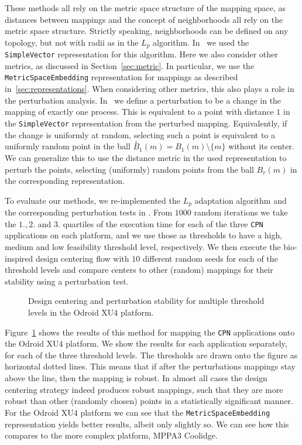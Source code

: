 These methods all rely on the metric space structure of the mapping space, as distances between mappings and the concept of neighborhoods all rely on the metric space structure.
Strictly speaking, neighborhoods can be defined on any topology, but not with radii as in the $L_p$ algorithm.
In~\cite{hempel_scopes17} we used the \texttt{SimpleVector} representation for this algorithm.
Here we also consider other metrics, as discussed in Section~\ref{sec:metric}.
In particular, we use the \texttt{MetricSpaceEmbedding} representation for mappings as described in~\ref{sec:representations}.
When considering other metrics, this also plays a role in the perturbation analysis.
In~\cite{hempel_scopes17} we define a perturbation to be a change in the mapping of exactly one process.
This is equivalent to a point with distance $1$ in the \texttt{SimpleVector} representation from the perturbed mapping.
Equivalently, if the change is uniformly at random, selecting such a point is equivalent to a uniformly random point in the ball $\overset{\circ}{B}_1(m) = B_1(m) \setminus \{ m \}$ without its center.
We can generalize this to use the distance metric in the used representation to perturb the points, selecting (uniformly) random points from the ball $B_r(m)$ in the corresponding representation.

To evaluate our methods, we re-implemented the $L_p$ adaptation algorithm and the corresponding perturbation tests in \mocasin. 
From $1000$ random iterations we take the $1.,2.$ and $3.$ quartiles of the execution time for each of the three \texttt{CPN} applications on each platform, and we use those as thresholds to have a high, medium and low feasibility threshold level, respectively.
We then execute the bio-inspired design centering flow with $10$ different random seeds for each of the threshold levels and compare centers to other (random) mappings for their stability using a perturbation test.

\begin{figure}[h]
	\centering
	\caption{Design centering and perturbation stability for multiple threshold levels in the Odroid XU4 platform.}
	\label{fig:design_centering_exynos}
\end{figure}

Figure~\ref{fig:design_centering_exynos} shows the results of this method for mapping the \texttt{CPN} applications onto the Odroid XU4 platform.
We show the results for each application separately, for each of the three threshold levels. The thresholds are drawn onto the figure as horizontal dotted lines. 
This means that if after the perturbations mappings stay above the line, then the mapping is robust.
In almost all cases the design centering strategy indeed produces robust mappings, such that they are more robust than other (randomly chosen) points in a statistically significant manner.
For the Odroid XU4 platform we can see that the \texttt{MetricSpaceEmbedding} representation yields better results, albeit only slightly so.
We can see how this compares to the more complex platform, MPPA3 Coolidge.

